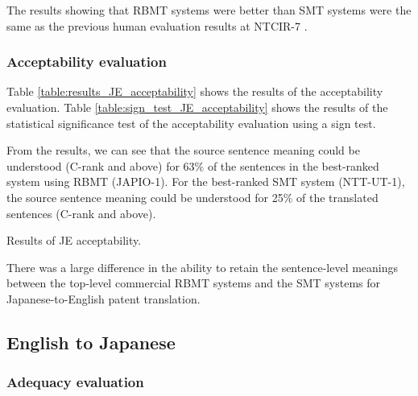 \documentclass[english]{jnlp_1.4}
\begin{document}
\begin{table}[t]
\label{table:sign_test_JE_adequacy}

\end{table}

The results showing that RBMT systems were better than SMT systems were the same as the previous human evaluation results at NTCIR-7 \cite{Fujii-EtAl:NTCIR7}. 


\subsubsection{Acceptability evaluation}

Table \ref{table:results_JE_acceptability} shows the results of the acceptability evaluation. 
Table \ref{table:sign_test_JE_acceptability} shows the results of the statistical significance test of the acceptability evaluation using a sign test.

From the results, we can see that the source sentence meaning could be understood (C-rank and above) for 63\% of the sentences in the best-ranked system using RBMT (JAPIO-1). 
For the best-ranked SMT system (NTT-UT-1), the source sentence meaning could be understood for 25\% of the translated sentences (C-rank and above).

\begin{table}[t]
\caption{Results of JE acceptability.}
\label{table:results_JE_acceptability}

\end{table}
\begin{table}[t]
\label{table:sign_test_JE_acceptability}

\end{table}

There was a large difference in the ability to retain the sentence-level meanings between the top-level commercial RBMT systems and the SMT systems for Japanese-to-English patent translation.


\subsection{English to Japanese}

\subsubsection{Adequacy evaluation}
\end{document}
